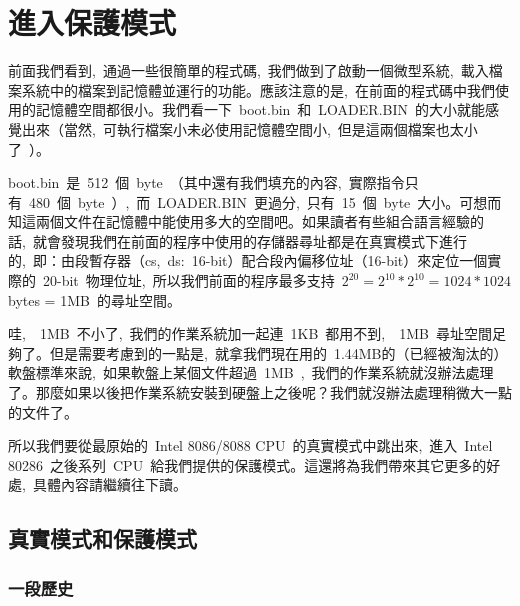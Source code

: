 \chapter{進入保護模式} \label{CHpm}

前面我們看到,~通過一些很簡單的程式碼,~我們做到了啟動一個微型系統,~載入檔案系統中的檔案到記憶體並運行的功能。應該注意的是,~在前面的程式碼中我們使用的記憶體空間都很小。我們看一下~boot.bin~和~LOADER.BIN~的大小就能感覺出來（當然,~可執行檔案小未必使用記憶體空間小,~但是這兩個檔案也太小了~\smiley）。


boot.bin~是~512~個~byte~（其中還有我們填充的內容,~實際指令只有~480~個~byte~）,~而~LOADER.BIN~更過分,~只有~15~個~byte~大小。可想而知這兩個文件在記憶體中能使用多大的空間吧。如果讀者有些組合語言經驗的話,~就會發現我們在前面的程序中使用的存儲器尋址都是在真實模式下進行的,~即：由段暫存器（cs,~ds:~16-bit）配合段內偏移位址（16-bit）來定位一個實際的~20-bit~物理位址,~所以我們前面的程序最多支持~$2^{20} = 2^{10}*2^{10} = 1024*1024$ bytes = 1MB~的尋址空間。

哇,~~1MB~不小了,~我們的作業系統加一起連~1KB~都用不到,~~1MB~尋址空間足夠了。但是需要考慮到的一點是,~就拿我們現在用的~1.44MB的（已經被淘汰的）軟盤標準來說,~如果軟盤上某個文件超過~1MB~,~我們的作業系統就沒辦法處理了。那麼如果以後把作業系統安裝到硬盤上之後呢？我們就沒辦法處理稍微大一點的文件了。

所以我們要從最原始的~Intel 8086/8088 CPU~的真實模式中跳出來,~進入~Intel 80286~之後系列~CPU~給我們提供的保護模式。這還將為我們帶來其它更多的好處,~具體內容請繼續往下讀。

\section{真實模式和保護模式}


\subsection{一段歷史}

